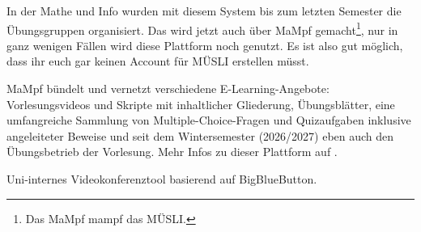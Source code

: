 \begin{description}[style=nextline]
	\item[\href{https://muesli.mathi.uni-heidelberg.de}{MÜSLI}]
    In der Mathe und Info wurden mit diesem System bis zum letzten Semester die Übungsgruppen organisiert. Das wird jetzt auch über MaMpf gemacht\footnote{Das MaMpf mampf das MÜSLI.}, nur in ganz wenigen Fällen wird diese Plattform noch genutzt. Es ist also gut möglich, dass ihr euch gar keinen Account für MÜSLI erstellen müsst.

	\item[\href{https://mampf.mathi.uni-heidelberg.de}{MaMpf (Mathematische Medienplattform)}]
    MaMpf bündelt und vernetzt verschiedene E-Learning-Angebote: Vorlesungsvideos und Skripte mit inhaltlicher Gliederung, Übungsblätter, eine umfangreiche Sammlung von Multiple-Choice-Fragen und Quizaufgaben inklusive angeleiteter Beweise und seit dem Wintersemester (2026/2027) eben auch den Übungsbetrieb der Vorlesung. Mehr Infos zu dieser Plattform auf .

	\item[\href{https://heiconf.uni-heidelberg.de}{heiCONF}]
    Uni-internes Videokonferenztool basierend auf BigBlueButton. 
\end{description}




\newpage

